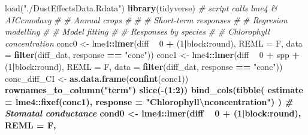 \documentclass[]{scrartcl}
\newenvironment{Shaded}{\begin{snugshade}}{\end{snugshade}}
\newcommand{\CharTok}[1]{\textcolor[rgb]{0.31,0.60,0.02}{#1}}
\newcommand{\CommentTok}[1]{\textcolor[rgb]{0.56,0.35,0.01}{\textit{#1}}}
\newcommand{\DataTypeTok}[1]{\textcolor[rgb]{0.13,0.29,0.53}{#1}}
\newcommand{\DecValTok}[1]{\textcolor[rgb]{0.00,0.00,0.81}{#1}}
\newcommand{\KeywordTok}[1]{\textcolor[rgb]{0.13,0.29,0.53}{\textbf{#1}}}
\newcommand{\NormalTok}[1]{#1}
\newcommand{\OperatorTok}[1]{\textcolor[rgb]{0.81,0.36,0.00}{\textbf{#1}}}
\newcommand{\StringTok}[1]{\textcolor[rgb]{0.31,0.60,0.02}{#1}}
\begin{document}
\begin{Shaded}
\begin{Highlighting}[]
load(\StringTok{"./DustEffectsData.Rdata"}) 
\KeywordTok{library}(tidyverse) \CommentTok{# script calls lme4 \& AICcmodavg}
\CommentTok{#}
\CommentTok{# Annual crops }
\CommentTok{#}
\CommentTok{#}
\CommentTok{# Short-term responses}
\CommentTok{#}
\CommentTok{# Regresion modelling }
\CommentTok{#}
\CommentTok{# Model fitting }
\CommentTok{#}
\CommentTok{# Responses by species }
\CommentTok{#}
  \CommentTok{# Chlorophyll concentration  }
\NormalTok{    conc0 <-}\StringTok{ }\NormalTok{lme4}\OperatorTok{::}\KeywordTok{lmer}\NormalTok{(diff }\OperatorTok{~}\StringTok{ }\DecValTok{0} \OperatorTok{+}\StringTok{ }\NormalTok{(}\DecValTok{1}\OperatorTok{|}\NormalTok{block}\OperatorTok{:}\NormalTok{round), }\DataTypeTok{REML =}\NormalTok{ F,}
                        \DataTypeTok{data =} \KeywordTok{filter}\NormalTok{(diff_dat, response }\OperatorTok{==}\StringTok{ "conc"}\NormalTok{)) }
\NormalTok{    conc1 <-}\StringTok{ }\NormalTok{lme4}\OperatorTok{::}\KeywordTok{lmer}\NormalTok{(diff }\OperatorTok{~}\StringTok{ }\DecValTok{0} \OperatorTok{+}\StringTok{ }\NormalTok{spp }\OperatorTok{+}\StringTok{ }\NormalTok{(}\DecValTok{1}\OperatorTok{|}\NormalTok{block}\OperatorTok{:}\NormalTok{round), }\DataTypeTok{REML =}\NormalTok{ F,}
                        \DataTypeTok{data =} \KeywordTok{filter}\NormalTok{(diff_dat, response }\OperatorTok{==}\StringTok{ "conc"}\NormalTok{)) }
\NormalTok{    conc_diff_CI <-}\StringTok{ }\KeywordTok{as.data.frame}\NormalTok{(}\KeywordTok{confint}\NormalTok{(conc1)) }\OperatorTok{%
\StringTok{                      }\KeywordTok{rownames_to_column}\NormalTok{(}\StringTok{"term"}\NormalTok{) }\OperatorTok{%
\StringTok{                      }\KeywordTok{slice}\NormalTok{(}\OperatorTok{-}\NormalTok{(}\DecValTok{1}\OperatorTok{:}\DecValTok{2}\NormalTok{)) }\OperatorTok{%
\StringTok{                      }\KeywordTok{bind_cols}\NormalTok{(}\KeywordTok{tibble}\NormalTok{(}
                        \DataTypeTok{estimate =}\NormalTok{ lme4}\OperatorTok{::}\KeywordTok{fixef}\NormalTok{(conc1), }
                        \DataTypeTok{response =} \StringTok{"Chlorophyll}\CharTok{\textbackslash{}n}\StringTok{concentration"}\NormalTok{) ) }
  \CommentTok{# Stomatal conductance}
\NormalTok{    cond0 <-}\StringTok{ }\NormalTok{lme4}\OperatorTok{::}\KeywordTok{lmer}\NormalTok{(diff }\OperatorTok{~}\StringTok{ }\DecValTok{0} \OperatorTok{+}\StringTok{ }\NormalTok{(}\DecValTok{1}\OperatorTok{|}\NormalTok{block}\OperatorTok{:}\NormalTok{round), }\DataTypeTok{REML =}\NormalTok{ F,}
}}}
\end{Highlighting}
\end{Shaded}
\end{document}
